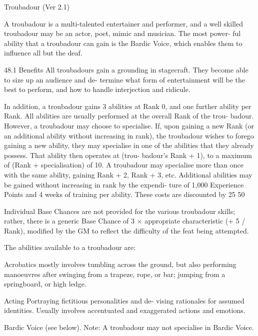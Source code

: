 \begin{Chapter}{Troubadour (Ver 2.1)}

A  troubadour  is  a  multi-talented  entertainer  and 
performer, and a well skilled troubadour may be an 
actor, poet, mimic and musician. The most power-
ful ability that a troubadour can gain is the Bardic 
Voice, which enables them to influence all but the 
deaf. 

48.1 Benefits 
All  troubadours  gain  a  grounding  in  stagecraft. 
They  become  able  to  size  up  an  audience  and  de-
termine what form of entertainment will be the best 
to  perform,  and  how  to  handle  interjection  and 
ridicule. 

In  addition,  a  troubadour  gains  3  abilities  at  Rank 
0, and one further ability per Rank. All abilities are 
usually  performed  at  the  overall  Rank  of  the  trou-
badour.  However,  a  troubadour  may  choose  to 
specialise.  If,  upon  gaining  a  new  Rank  (or  an 
additional  ability  without  increasing  in  rank),  the 
troubadour wishes to forego gaining a new ability, 
they may specialise in one of the abilities that they 
already possess. That ability then operates at (trou-
badour’s  Rank  +  1),  to  a  maximum  of  (Rank  + 
specialisation)  of  10.  A  troubadour  may  specialise 
more than once with the same ability, gaining Rank 
+  2,  Rank  +  3,  etc.  Additional  abilities  may  be 
gained  without  increasing  in  rank  by  the  expendi-
ture  of  1,000  Experience  Points  and  4  weeks  of 
training  per  ability.  These  costs  are  discounted  by 
25%
50%

Individual  Base  Chances  are  not  provided  for  the 
various troubadour skills; rather, there is a generic 
Base Chance of 3 × appropriate characteristic (+ 5 / 
Rank), modified by the GM to reflect the difficulty 
of the feat being attempted. 

The abilities available to a troubadour are: 

Acrobatics  mostly  involves  tumbling  across  the 
ground,  but  also  performing  manoeuvres  after 
swinging  from  a  trapeze,  rope,  or  bar;  jumping 
from a springboard, or high ledge. 

Acting  Portraying  fictitious  personalities  and  de-
vising  rationales  for  assumed  identities.  Usually 
involves  accentuated  and  exaggerated  actions  and 
emotions. 

Bardic  Voice  (see  below).  Note:  A  troubadour 
may not specialise in Bardic Voice. 


\end{Chapter}
